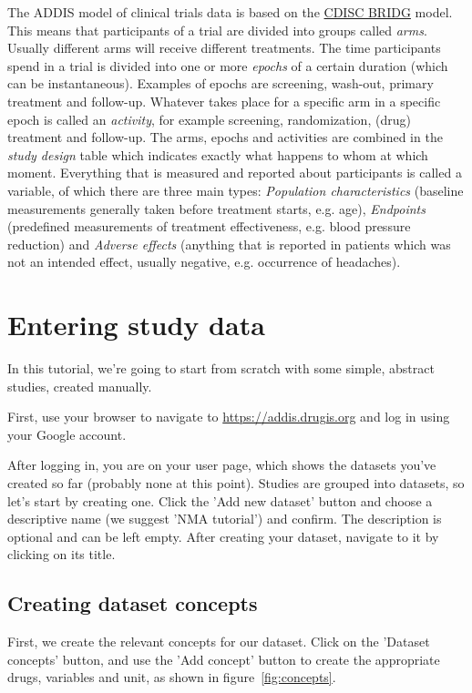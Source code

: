 \documentclass[12pt]{article}
\begin{document}
The ADDIS model of clinical trials data is based on the \href{https://www.cdisc.org/standards/domain-information-module/bridg}{CDISC BRIDG} model.
This means that participants of a trial are divided into groups called \textit{arms}.
Usually different arms will receive different treatments.
The time participants spend in a trial is divided into one or more \textit{epochs} of a certain duration (which can be instantaneous).
Examples of epochs are screening, wash-out, primary treatment and follow-up.
Whatever takes place for a specific arm in a specific epoch is called an \textit{activity}, for example screening, randomization, (drug) treatment and follow-up.
The arms, epochs and activities are combined in the \textit{study design} table which indicates exactly what happens to whom at which moment.
Everything that is measured and reported about participants is called a variable, of which there are three main types: \textit{Population characteristics} (baseline measurements generally taken before treatment starts, e.g. age), \textit{Endpoints} (predefined measurements of treatment effectiveness, e.g. blood pressure reduction) and \textit{Adverse effects} (anything that is reported in patients which was not an intended effect, usually negative, e.g. occurrence of headaches).

\section{Entering study data}

In this tutorial, we're going to start from scratch with some simple, abstract studies, created manually.

First, use your browser to navigate to \href{https://addis.drugis.org}{https://addis.drugis.org} and log in using your Google account.

After logging in, you are on your user page, which shows the datasets you've created so far (probably none at this point).
Studies are grouped into datasets, so let's start by creating one.
Click the 'Add new dataset' button and choose a descriptive name (we suggest 'NMA tutorial') and confirm.
The description is optional and can be left empty.
After creating your dataset, navigate to it by clicking on its title.

\subsection{Creating dataset concepts}

First, we create the relevant concepts for our dataset.
Click on the 'Dataset concepts' button, and use the 'Add concept' button to create the appropriate drugs, variables and unit, as shown in figure~\ref{fig:concepts}.
\end{document}
